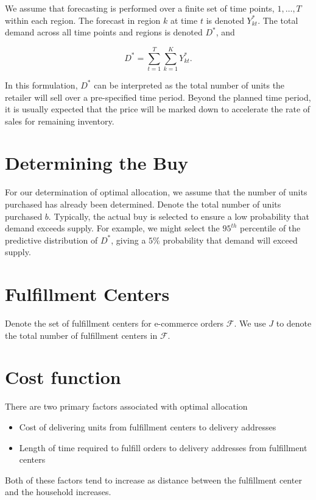 \documentclass[11pt, oneside]{article}   	%
\begin{document}
\noindent We assume that forecasting is performed over a finite set of time points, $1, \ldots, T$ within each region.  The forecast in region $k$ at time $t$ is denoted $Y_{kt}^*$.  The total demand across all time points and regions is denoted $D^*$, and

$$D^* = \sum_{t = 1}^T \sum_{k = 1}^K Y_{kt}^*.$$

In this formulation, $D^*$ can be interpreted as the total number of units the retailer will sell over a pre-specified time period.  Beyond the planned time period, it is usually expected that the price will be marked down to accelerate the rate of sales for remaining inventory.

\section{Determining the Buy}

For our determination of optimal allocation, we assume that the number of units purchased has already been determined.  Denote the total number of units purchased $b$.  Typically, the actual buy is selected to ensure a low probability that demand exceeds supply.  For example, we might select the $95^{th}$ percentile of the predictive distribution of $D^*$, giving a $5\%$ probability that demand will exceed supply.

\section{Fulfillment Centers}

Denote the set of fulfillment centers for e-commerce orders $\mathcal{F}$.  We use $J$ to denote the total number of fulfillment centers in $\mathcal{F}$.

\section{Cost function}

There are two primary factors associated with optimal allocation

\begin{itemize}
\item Cost of delivering units from fulfillment centers to delivery addresses
\item Length of time required to fulfill orders to delivery addresses from fulfillment centers
\end{itemize}

Both of these factors tend to increase as distance between the fulfillment center and the household increases.
\end{document}
